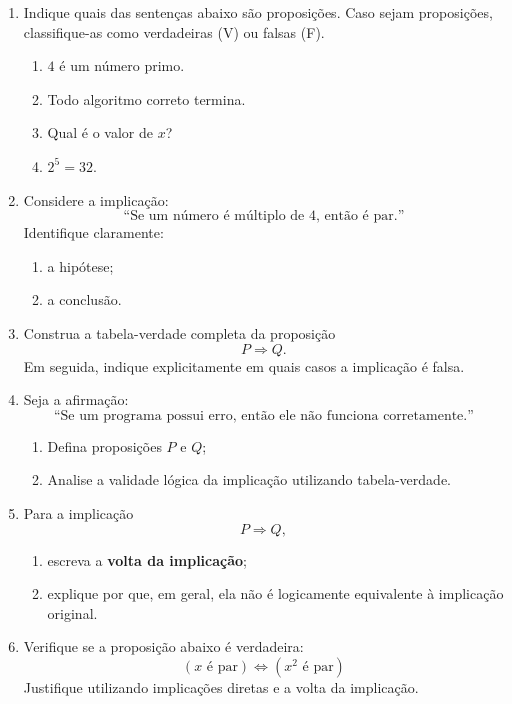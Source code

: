 \documentclass[12pt]{article}
\begin{document}
\begin{enumerate}

\item Indique quais das sentenças abaixo são proposições.
Caso sejam proposições, classifique-as como verdadeiras (V) ou falsas (F).
\begin{enumerate}[label=(\hspace{1.2em})]
    \item $4$ é um número primo.
    \item Todo algoritmo correto termina.
    \item Qual é o valor de $x$?
    \item $2^5 = 32$.
\end{enumerate}

\item Considere a implicação:
\[
\text{``Se um número é múltiplo de 4, então é par.''}
\]
Identifique claramente:
\begin{enumerate}[label=(\hspace{1.2em})]
    \item a hipótese;
    \item a conclusão.
\end{enumerate}

\item Construa a tabela-verdade completa da proposição
\[
P \Rightarrow Q.
\]
Em seguida, indique explicitamente em quais casos a implicação é falsa.

\item Seja a afirmação:
\[
\text{``Se um programa possui erro, então ele não funciona corretamente.''}
\]
\begin{enumerate}
    \item Defina proposições $P$ e $Q$;
    \item Analise a validade lógica da implicação utilizando tabela-verdade.
\end{enumerate}

\item Para a implicação
\[
P \Rightarrow Q,
\]
\begin{enumerate}
    \item escreva a \textbf{volta da implicação};
    \item explique por que, em geral, ela não é logicamente equivalente
    à implicação original.
\end{enumerate}

\item Verifique se a proposição abaixo é verdadeira:
\[
(x \text{ é par}) \Leftrightarrow (x^2 \text{ é par})
\]
Justifique utilizando implicações diretas e a volta da implicação.


\end{enumerate}
\end{document}
